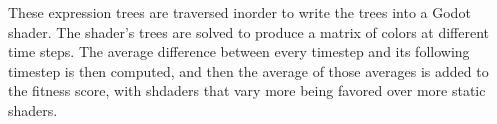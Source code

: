 \documentclass{article}
\begin{document}
These expression trees are traversed inorder to write the trees into a Godot shader. The shader's trees are solved to produce a matrix of colors at different time steps. The average difference between every timestep and its following timestep is then computed,
and then the average of those averages is added to the fitness score, with shdaders that vary more being favored over more static shaders.
\end{document}
